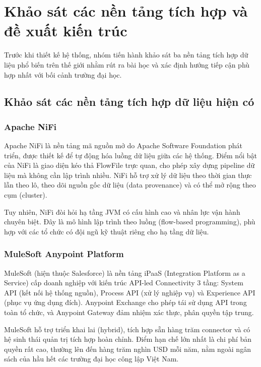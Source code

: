 \newpage
\section{Khảo sát các nền tảng tích hợp và đề xuất kiến trúc}

Trước khi thiết kế hệ thống, nhóm tiến hành khảo sát ba nền tảng tích hợp dữ liệu phổ biến trên thế giới nhằm rút ra bài học và xác định hướng tiếp cận phù hợp nhất với bối cảnh trường đại học.

\subsection{Khảo sát các nền tảng tích hợp dữ liệu hiện có}

\subsubsection{Apache NiFi}

Apache NiFi là nền tảng mã nguồn mở do Apache Software Foundation phát triển, được thiết kế để tự động hóa luồng dữ liệu giữa các hệ thống. Điểm nổi bật của NiFi là giao diện kéo thả FlowFile trực quan, cho phép xây dựng pipeline dữ liệu mà không cần lập trình nhiều. NiFi hỗ trợ xử lý dữ liệu theo thời gian thực lẫn theo lô, theo dõi nguồn gốc dữ liệu (data provenance) và có thể mở rộng theo cụm (cluster).

Tuy nhiên, NiFi đòi hỏi hạ tầng JVM có cấu hình cao và nhân lực vận hành chuyên biệt. Đây là mô hình lập trình theo luồng (flow-based programming), phù hợp với các tổ chức có đội ngũ kỹ thuật riêng cho hạ tầng dữ liệu.

\subsubsection{MuleSoft Anypoint Platform}

MuleSoft (hiện thuộc Salesforce) là nền tảng iPaaS (Integration Platform as a Service) cấp doanh nghiệp với kiến trúc API-led Connectivity 3 tầng: System API (kết nối hệ thống nguồn), Process API (xử lý nghiệp vụ) và Experience API (phục vụ ứng dụng đích). Anypoint Exchange cho phép tái sử dụng API trong toàn tổ chức, và Anypoint Gateway đảm nhiệm xác thực, phân quyền tập trung.

MuleSoft hỗ trợ triển khai lai (hybrid), tích hợp sẵn hàng trăm connector và có hệ sinh thái quản trị tích hợp hoàn chỉnh. Điểm hạn chế lớn nhất là chi phí bản quyền rất cao, thường lên đến hàng trăm nghìn USD mỗi năm, nằm ngoài ngân sách của hầu hết các trường đại học công lập Việt Nam.

